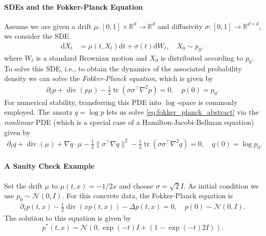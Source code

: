 \paragraph{SDEs and the Fokker-Planck Equation}
Assume we are given a drift $\mu:[0,1]\times \mathbb R^d\to\mathbb R^d$ and diffusivity $\sigma:[0,1] \to \mathbb R^{d\times d}$, we consider the SDE
\begin{align}\label{eq:sde_abstract}
    \mathrm dX_t
    &=
    \mu(t, X_t)\mathrm d t
    +
    \sigma(t) \mathrm d W_t,
    \quad 
    X_0 \sim p_0,
\end{align}
where $W_t$ is a standard Brownian motion and $X_0$ is distributed according to $p_0$. To solve this SDE, i.e., to obtain the dynamics of the associated probability density we can solve the \emph{Fokker-Planck equation}, which is given by
\begin{align}\label{eq:fokker_planck_abstract}
    \partial_t p
    +
    \operatorname{div}(p\mu)
    -
    \frac12 \operatorname{tr}(\sigma \sigma^\top\nabla^2 p)
    =
    0,
    \quad
    p(0) = p_0.
\end{align}
For numerical stability, transferring this PDE into $\log$-space is commonly employed. The ansatz $q = \log p$ lets us solve \eqref{eq:fokker_planck_abstract} via the \emph{nonlinear} PDE (which is a special case of a Hamilton-Jacobi-Bellman equation) given by
\begin{align}
    \partial_t q
    +
    \operatorname{div}(\mu)
    +
    \nabla q \cdot \mu
    -
    \frac12 \| \sigma^\top \nabla q \|^2
    -
    \frac12 \operatorname{tr}(\sigma \sigma^\top\nabla^2 q)
    =
    0,
    \quad
    q(0) = \log p_0.
\end{align}

\paragraph{A Sanity Check Example}
Set the drift $\mu$ to $\mu(t,x) = -1/2x$ and choose $\sigma=\sqrt 2 I$. As initial condition we use $p_0 \sim \mathcal N(0,I)$. For this concrete data, the Fokker-Planck equation is
\begin{align}\label{eq:fokker_planck_sanity_example}
    \partial_t p(t, x)
    -
    \frac12 \operatorname{div}(xp(t,x))
    -
    \Delta p(t,x)
    =
    0,
    \quad 
    p(0) \sim \mathcal N(0, I).
\end{align}
The solution to this equation is given by
\begin{equation}
    p^*(t, x) \sim \mathcal N(0, \exp(-t)I + (1 - \exp(-t) 2 I)).
\end{equation}

